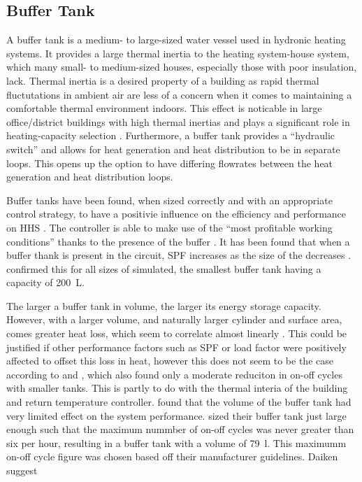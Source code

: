 \subsection{Buffer Tank} 
A buffer tank is a medium- to large-sized water vessel used in hydronic heating systems. It provides a large thermal inertia to the heating system-house system, which many small- to medium-sized houses, especially those with poor insulation, lack. Thermal inertia is a desired property of a building as rapid thermal fluctutations in ambient air are less of a concern when it comes to maintaining a comfortable thermal environment indoors. This effect is noticable in large office/district buildings with high thermal inertias and plays a significant role in heating-capacity selection \cite{owen_ashrae_2009}. Furthermore, a buffer tank provides a ``hydraulic switch'' and allows for heat generation and heat distribution to be in separate loops. This opens up the option to have differing flowrates between the heat generation and heat distribution loops. 

Buffer tanks have been found, when sized correctly and with an appropriate control strategy, to have a positivie influence on the efficiency and performance on \acs{HHS} \cite{klein_numerical_2014,roccatello_analysis_2022}. The controller is able to make use of the \HPs ``most profitable working conditions'' thanks to the presence of the buffer \cite{dettorre_economic_2018}. It has been found that when a buffer thank is present in the \HP circuit, \ac{SPF} increases as the size of the \HP decreases \cite{mugnini_variable-load_2021}. \citeauthor{mugnini_variable-load_2021} confirmed this for all sizes of \HPs simulated, the smallest buffer tank having a capacity of \SI{200}{\liter}. 

The larger a buffer tank in volume, the larger its energy storage capacity. However, with a larger volume, and naturally larger cylinder and surface area, comes greater heat loss, which seem to correlate almost linearly \cite{klein_numerical_2014}. This could be justified if other performance factors such as \ac{SPF} or load factor were positively affected to offset this loss in heat, however this does not seem to be the case according to \cite{roccatello_analysis_2022} and \citeauthor{klein_numerical_2014}, which also found only a moderate reduciton in on-off cycles with smaller tanks. This is partly to do with the thermal interia of the building and return temperature controller. 
\citeauthor{klein_numerical_2014} found that the volume of the buffer tank had very limited effect on the system performance. \citeauthor{dongellini_influence_2021} sized their buffer tank just large enough such that the maximum nummber of on-off cycles was never greater than six per hour,  resulting in a buffer tank with a volume of \SI{79}{\litre}.  This maximumm on-off cycle figure was chosen based off their \HP  manufacturer guidelines. Daiken suggest %
\cite{dettorre_economic_2018}

